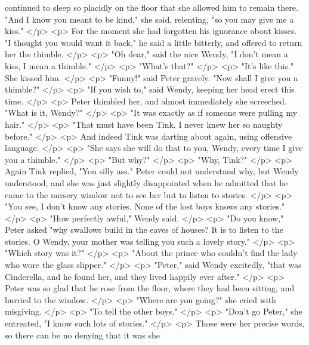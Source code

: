       continued to sleep so placidly on the floor that she allowed him to remain
      there. "And I know you meant to be kind," she said, relenting, "so you may
      give me a kiss."
    </p>
    <p>
      For the moment she had forgotten his ignorance about kisses. "I thought
      you would want it back," he said a little bitterly, and offered to return
      her the thimble.
    </p>
    <p>
      "Oh dear," said the nice Wendy, "I don't mean a kiss, I mean a thimble."
    </p>
    <p>
      "What's that?"
    </p>
    <p>
      "It's like this." She kissed him.
    </p>
    <p>
      "Funny!" said Peter gravely. "Now shall I give you a thimble?"
    </p>
    <p>
      "If you wish to," said Wendy, keeping her head erect this time.
    </p>
    <p>
      Peter thimbled her, and almost immediately she screeched. "What is it,
      Wendy?"
    </p>
    <p>
      "It was exactly as if someone were pulling my hair."
    </p>
    <p>
      "That must have been Tink. I never knew her so naughty before."
    </p>
    <p>
      And indeed Tink was darting about again, using offensive language.
    </p>
    <p>
      "She says she will do that to you, Wendy, every time I give you a
      thimble."
    </p>
    <p>
      "But why?"
    </p>
    <p>
      "Why, Tink?"
    </p>
    <p>
      Again Tink replied, "You silly ass." Peter could not understand why, but
      Wendy understood, and she was just slightly disappointed when he admitted
      that he came to the nursery window not to see her but to listen to
      stories.
    </p>
    <p>
      "You see, I don't know any stories. None of the lost boys knows any
      stories."
    </p>
    <p>
      "How perfectly awful," Wendy said.
    </p>
    <p>
      "Do you know," Peter asked "why swallows build in the eaves of houses? It
      is to listen to the stories. O Wendy, your mother was telling you such a
      lovely story."
    </p>
    <p>
      "Which story was it?"
    </p>
    <p>
      "About the prince who couldn't find the lady who wore the glass slipper."
    </p>
    <p>
      "Peter," said Wendy excitedly, "that was Cinderella, and he found her, and
      they lived happily ever after."
    </p>
    <p>
      Peter was so glad that he rose from the floor, where they had been
      sitting, and hurried to the window.
    </p>
    <p>
      "Where are you going?" she cried with misgiving.
    </p>
    <p>
      "To tell the other boys."
    </p>
    <p>
      "Don't go Peter," she entreated, "I know such lots of stories."
    </p>
    <p>
      Those were her precise words, so there can be no denying that it was she
